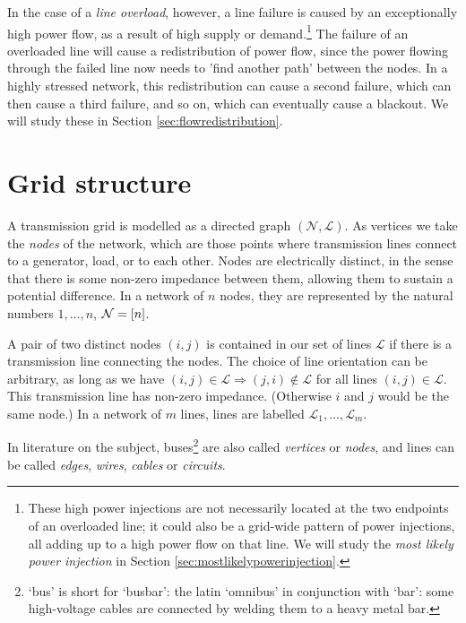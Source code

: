 \documentclass[main.tex]{subfiles}
\begin{document}
In the case of a \emph{line overload}, however, a line failure is caused by an exceptionally high power flow, as a result of high supply or demand.\footnote{These high power injections are not necessarily located at the two endpoints of an overloaded line; it could also be a grid-wide pattern of power injections, all adding up to a high power flow on that line. We will study the \emph{most likely power injection} in Section \ref{sec:mostlikelypowerinjection}.}
The failure of an overloaded line will cause a redistribution of power flow, since the power flowing through the failed line now needs to 'find another path' between the nodes. In a highly stressed network, this redistribution can cause a second failure, which can then cause a third failure, and so on, which can eventually cause a blackout. We will study these  in Section \ref{sec:flowredistribution}.

\section{Grid structure}
A transmission grid is modelled as a directed graph $(\mathcal{N},\mathcal{L})$.%
As vertices we take the \emph{nodes} of the network, which are those points where transmission lines connect to a generator, load, or to each other. Nodes are electrically distinct, in the sense that there is some non-zero impedance between them, allowing them to sustain a potential difference. In a network of $n$ nodes, they are represented by the natural numbers $1,\dots,n$, \ie $\mathcal{N}=[n]$.

A pair of two distinct nodes $(i,j)$ is contained in our set of lines $\mathcal{L}$ if there is a transmission line connecting the nodes. The choice of line orientation can be arbitrary, as long as we have $(i,j) \in \mathcal{L} \Rightarrow (j,i) \notin \mathcal{L}$ for all lines $(i,j) \in \mathcal{L}$. This transmission line has non-zero impedance. (Otherwise $i$ and $j$ would be the same node.) In a network of $m$ lines, lines are labelled $\mathcal{L}_1, \dots, \mathcal{L}_m$. 

In literature on the subject, buses\footnote{`bus' is short for `busbar': the latin `omnibus' in conjunction with `bar': some high-voltage cables are connected by welding them to a heavy metal bar.} are also called \emph{vertices} or \emph{nodes}, and lines can be called \emph{edges}, \emph{wires}, \emph{cables} or \emph{circuits}.
\end{document}
